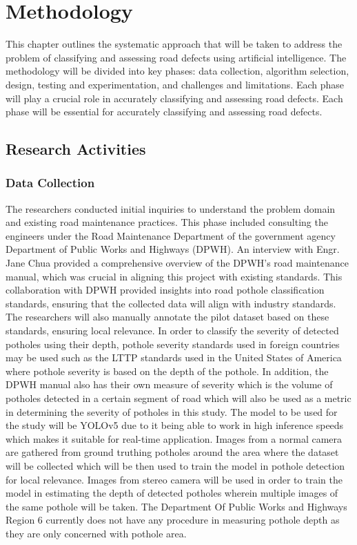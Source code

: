 \chapter{Methodology}
This chapter outlines the systematic approach that will be taken to address the problem of classifying and assessing road defects using artificial intelligence. The methodology will be divided into key phases: data collection, algorithm selection, design, testing and experimentation, and challenges and limitations. Each phase will play a crucial role in accurately classifying and assessing road defects.  Each phase will be essential for accurately classifying and assessing road defects. 

\section{\textbf{ Research Activities} }

\subsection{\textbf{Data Collection} }
The researchers conducted initial inquiries to understand the problem domain and existing road maintenance practices. This phase included consulting the engineers under the Road Maintenance Department of the government agency Department of Public Works and Highways (DPWH). An interview with Engr. Jane Chua provided a comprehensive overview of the DPWH's road maintenance manual, which was crucial in aligning this project with existing standards. This collaboration with DPWH provided insights into road pothole classification standards, ensuring that the collected data will align with industry standards. The researchers will also manually annotate the pilot dataset based on these standards, ensuring local relevance. In order to classify the severity of detected potholes using their depth, pothole severity standards used in foreign countries may be used such as the LTTP standards used in the United States of America where pothole severity is based on the depth of the pothole. In addition, the DPWH manual also has their own measure of severity which is the volume of potholes detected in a certain segment of road which will also be used as a metric in determining the severity of potholes in this study. The model to be used for the study will be YOLOv5 due to it being able to work in high inference speeds which makes it suitable for real-time application. Images from a normal camera are gathered from ground truthing potholes around the area where the dataset will be collected which will be then used to train the model in pothole detection for local relevance. Images from stereo camera will be used in order to train the model in estimating the depth of detected potholes wherein multiple images of the same pothole will be taken. The Department Of Public Works and Highways Region 6 currently does not have any procedure in measuring pothole depth as they are only concerned with pothole area.

